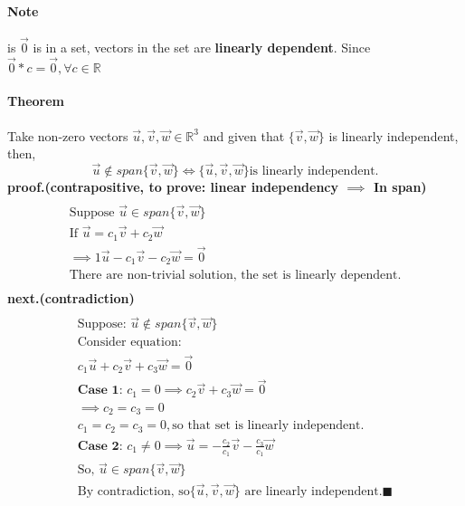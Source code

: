 \documentclass{article}
\begin{document}
	\paragraph{Note} is $\vec{0}$ is in a set, vectors in the set are \textbf{linearly dependent}. Since $\vec{0}*c=\vec{0},\forall c\in \mathbb{R}$
	\paragraph{Theorem} Take non-zero vectors $\vec{u},\vec{v},\vec{w}\in\mathbb{R}^3$ and given that $\{\vec{v},\vec{w}\}$ is linearly independent, then,
	\[
	\vec{u} \notin span\{\vec{v},\vec{w}\} \iff \{\vec{u},\vec{v},\vec{w}\} \text{is linearly independent.}
	\]
	\newline \textbf{proof.(contrapositive, to prove: linear independency $\implies$ In span)}
	\begin{multline}
		\\
		\text{Suppose } \vec{u} \in span\{\vec{v},\vec{w}\} \\
		\text{If }\vec{u} = c_1 \vec{v} + c_2 \vec{w} \\
		\implies 1\vec{u} - c_1 \vec{v} - c_2 \vec{w} = \vec{0} \\
		\text{There are non-trivial solution, the set is linearly dependent.}
		\\
	\end{multline}
	\newline \textbf{next.(contradiction)}
	\begin{multline}
		\\
		\text{Suppose: }\vec{u} \notin span\{\vec{v},\vec{w}\} \\
		\text{Consider equation: }\\
		c_1 \vec{u} + c_2 \vec{v} + c_3 \vec{w} = \vec{0} \\
		\textbf{Case 1: } c_1 = 0 \implies c_2 \vec{v} + c_3 \vec{w} = \vec{0} \\
		\implies c_2 = c_3 = 0 \\
		c_1 = c_2 = c_3 = 0, \text{so that set is linearly independent.}\\
		\textbf{Case 2: } c_1 \neq 0 \implies \vec{u} = -\frac{c_2}{c_1} \vec{v} - \frac{c_3}{c_1}\vec{w} \\
		\text{So, }\vec{u} \in span\{\vec{v},\vec{w}\} \\
		\text{By contradiction, so} \{\vec{u},\vec{v},\vec{w}\} \text{ are linearly independent.} \blacksquare
		\\
	\end{multline}
\end{document}
